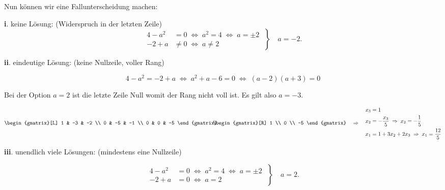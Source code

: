 \begin{solution}
    Nun können wir eine Fallunterscheidung machen:

    \vspace{1\baselineskip}

    \textbf{i}. keine Lösung: (Widerspruch in der letzten Zeile)
    \begin{equation*}
        \left.
        \begin{aligned}
            4 - a^2 &= 0 \; \Leftrightarrow \; a^2 = 4 \; \Leftrightarrow \; a = \pm 2\\
            -2 + a &\neq 0 \; \Leftrightarrow \; a \neq 2
        \end{aligned} \; \right\} \quad
        a = -2. 
    \end{equation*}

    \textbf{ii}. eindeutige Lösung: (keine Nullzeile, voller Rang)

    \begin{equation*}
        4-a^2 = -2+a \; \Leftrightarrow \; a^2+a-6 = 0 \; \Leftrightarrow \; (a-2)(a+3) = 0
    \end{equation*}

    Bei der Option \( a = 2 \) ist die letzte Zeile Null womit der Rang nicht voll ist. Es gilt also \( a = -3 \).

    \begin{equation*}
        \begin{gmatrix}[L]
            1 & -3 & -2 \\
            0 & -5 & -1 \\
            0 & 0 & -5
        \end{gmatrix} \hspace{-0.75em}
        \begin{gmatrix}[R]
            1 \\ 0 \\ -5
        \end{gmatrix} \quad \Rightarrow \quad
        \begin{aligned}
            x_3 &= 1 \\
            x_2 &= - \frac{x_3}{5} \; \Rightarrow \; x_2 = -\frac{1}{5} \\
            x_1 &= 1 + 3x_2 + 2x_3 \; \Rightarrow \; x_1 = \frac{12}{5}
        \end{aligned}
    \end{equation*}

    \textbf{iii}. unendlich viele Lösungen: (mindestens eine Nullzeile)
    
    \begin{equation*}
        \left.
        \begin{aligned}
            4 - a^2 &= 0 \; \Leftrightarrow \; a^2 = 4 \; \Leftrightarrow \; a = \pm 2\\
            -2 + a &= 0 \; \Leftrightarrow \; a = 2
        \end{aligned} \; \right\} \quad
        a = 2. 
    \end{equation*}


\end{solution}

